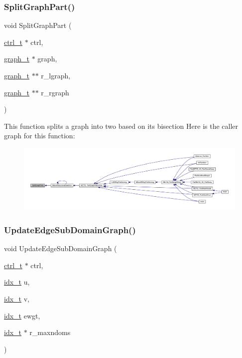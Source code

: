 \subsubsection{\texorpdfstring{Split\+Graph\+Part()}{SplitGraphPart()}}
{\footnotesize\ttfamily void Split\+Graph\+Part (\begin{DoxyParamCaption}\item[{\hyperlink{a00742}{ctrl\+\_\+t} $\ast$}]{ctrl,  }\item[{\hyperlink{a00734}{graph\+\_\+t} $\ast$}]{graph,  }\item[{\hyperlink{a00734}{graph\+\_\+t} $\ast$$\ast$}]{r\+\_\+lgraph,  }\item[{\hyperlink{a00734}{graph\+\_\+t} $\ast$$\ast$}]{r\+\_\+rgraph }\end{DoxyParamCaption})}

This function splits a graph into two based on its bisection Here is the caller graph for this function\+:\nopagebreak
\begin{figure}[H]
\begin{center}
\leavevmode
\includegraphics[width=350pt]{a00945_a49d272affb67ce57b2d20dccd7f15f53_icgraph}
\end{center}
\end{figure}
\mbox{\label{a00945_a004451dc6b5a9ebe36a063f7bcd6495a}} 
\subsubsection{\texorpdfstring{Update\+Edge\+Sub\+Domain\+Graph()}{UpdateEdgeSubDomainGraph()}}
{\footnotesize\ttfamily void Update\+Edge\+Sub\+Domain\+Graph (\begin{DoxyParamCaption}\item[{\hyperlink{a00742}{ctrl\+\_\+t} $\ast$}]{ctrl,  }\item[{\hyperlink{a00876_aaa5262be3e700770163401acb0150f52}{idx\+\_\+t}}]{u,  }\item[{\hyperlink{a00876_aaa5262be3e700770163401acb0150f52}{idx\+\_\+t}}]{v,  }\item[{\hyperlink{a00876_aaa5262be3e700770163401acb0150f52}{idx\+\_\+t}}]{ewgt,  }\item[{\hyperlink{a00876_aaa5262be3e700770163401acb0150f52}{idx\+\_\+t} $\ast$}]{r\+\_\+maxndoms }\end{DoxyParamCaption})}

